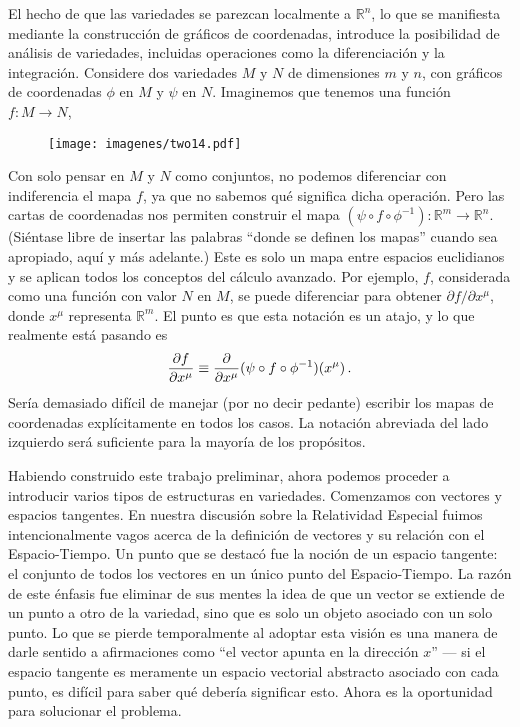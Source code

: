 \documentclass[11pt,b5paper,openany,twoside]{book}
\newcommand{\p}[1]{{\partial_{#1}}}
\newcommand{\R}{\mathbb{R}}
\begin{document}
El hecho de que las variedades se parezcan localmente a $\R^n$, lo que se manifiesta mediante la construcción de gráficos de coordenadas, introduce la posibilidad de análisis de variedades, incluidas operaciones como la diferenciación y la integración.
Considere dos variedades $M$ y $N$ de dimensiones $m$ y $n$, con gráficos de coordenadas $\phi$ en $M$ y $\psi$ en $N$.
Imaginemos que tenemos una función $f:M\rightarrow N$,

\begin{figure}[h]
\centering
\texttt{[image: imagenes/two14.pdf]}
\end{figure}

\noindent
Con solo pensar en $M$ y $N$ como conjuntos, no podemos diferenciar con indiferencia el mapa $f$, ya que no sabemos qué significa dicha operación.
Pero las cartas de coordenadas nos permiten construir el mapa $(\psi\circ f\circ\phi^{-1}):\R^m\rightarrow\R^n$.
(Siéntase libre de insertar las palabras ``donde se definen los mapas'' cuando sea apropiado, aquí y más adelante.)
Este es solo un mapa entre espacios euclidianos y se aplican todos los conceptos del cálculo avanzado.
Por ejemplo, $f$, considerada como una función con valor $N$ en $M$, se puede diferenciar para obtener ${\partial f}/ {\partial x^\mu}$, donde $x^\mu$ representa $\R^m$.
El punto es que esta notación es un atajo, y lo que realmente está pasando es
\begin{equation}
{{\partial f}\over{\p{} x^\mu}} \equiv {{\partial}\over{\p{} x^\mu}}
(\psi\circ f\circ\phi^{-1})(x^{\mu})\,.\label{2.7}
\end{equation}
Sería demasiado difícil de manejar (por no decir pedante) escribir los mapas de coordenadas explícitamente en todos los casos.
La notación abreviada del lado izquierdo será suficiente para la mayoría de los propósitos.

Habiendo construido este trabajo preliminar, ahora podemos proceder a introducir varios tipos de estructuras en variedades.
Comenzamos con vectores y espacios tangentes.
En nuestra discusión sobre la Relatividad Especial fuimos intencionalmente vagos acerca de la definición de vectores y su relación con el Espacio-Tiempo.
Un punto que se destacó fue la noción de un espacio tangente: el conjunto de todos los vectores en un único punto del Espacio-Tiempo.
La razón de este énfasis fue eliminar de sus mentes la idea de que un vector se extiende de un punto a otro de la variedad, sino que es solo un objeto asociado con un solo punto.
Lo que se pierde temporalmente al adoptar esta visión es una manera de darle sentido a afirmaciones como ``el vector apunta en la dirección $x$'' --- si el espacio tangente es meramente un espacio vectorial abstracto asociado con cada punto, es difícil para saber qué debería significar esto.
Ahora es la oportunidad para solucionar el problema.
\end{document}
